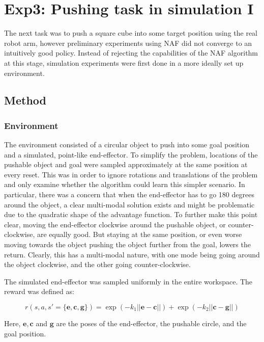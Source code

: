 \chapter{Exp3: Pushing task in simulation I}
\label{sec:push_sim_1}

The next task was to push a square cube into some target position using
the real robot arm, however preliminary experiments using NAF did not
converge to an intuitively good policy. Instead of rejecting the capabilities
of the NAF algorithm at this stage, simulation experiments were first done in
a more ideally set up environment.

\section{Method}


\subsection{Environment}

The environment consisted of a circular object to push into some goal position
and a simulated, point-like end-effector. To simplify the problem, locations of
the pushable object and goal were sampled approximately at the same position at
every reset. This was in order to ignore rotations and translations of the
problem and only examine whether the algorithm could learn this simpler
scenario. In particular, there was a concern that when the end-effector has to
go 180 degrees around the object, a clear multi-modal solution exists and might
be problematic due to the quadratic shape of the advantage function. To further
make this point clear, moving the end-effector clockwise around the pushable
object, or counter-clockwise, are equally good. But staying at the same
position, or even worse moving towards the object pushing the object further
from the goal, lowers the return. Clearly, this has a multi-modal nature, with
one mode being going around the object clockwise, and the other going
counter-clockwise.

The simulated end-effector was sampled uniformly in the entire workspace. The
reward was defined as:

\begin{equation}
    r(s, a, s'=\lbrace \mathbf{e, c, g} \rbrace) = \exp ( -k_1 ||\mathbf{e - c}||) + \exp (-k_2 ||\mathbf{c - g}|| )
\end{equation}

Here, $\mathbf{e, c}$ and $\mathbf{g}$ are the poses of the end-effector, the
pushable circle, and the goal position.

